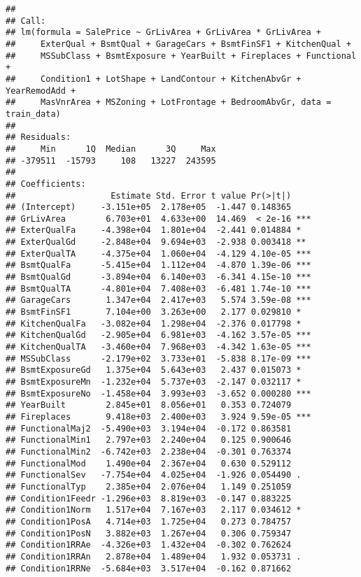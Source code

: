 \documentclass[
]{article}
\begin{document}
\begin{verbatim}
## 
## Call:
## lm(formula = SalePrice ~ GrLivArea + GrLivArea * GrLivArea + 
##     ExterQual + BsmtQual + GarageCars + BsmtFinSF1 + KitchenQual + 
##     MSSubClass + BsmtExposure + YearBuilt + Fireplaces + Functional + 
##     Condition1 + LotShape + LandContour + KitchenAbvGr + YearRemodAdd + 
##     MasVnrArea + MSZoning + LotFrontage + BedroomAbvGr, data = train_data)
## 
## Residuals:
##     Min      1Q  Median      3Q     Max 
## -379511  -15793     108   13227  243595 
## 
## Coefficients:
##                   Estimate Std. Error t value Pr(>|t|)    
## (Intercept)     -3.151e+05  2.178e+05  -1.447 0.148365    
## GrLivArea        6.703e+01  4.633e+00  14.469  < 2e-16 ***
## ExterQualFa     -4.398e+04  1.801e+04  -2.441 0.014884 *  
## ExterQualGd     -2.848e+04  9.694e+03  -2.938 0.003418 ** 
## ExterQualTA     -4.375e+04  1.060e+04  -4.129 4.10e-05 ***
## BsmtQualFa      -5.415e+04  1.112e+04  -4.870 1.39e-06 ***
## BsmtQualGd      -3.894e+04  6.140e+03  -6.341 4.15e-10 ***
## BsmtQualTA      -4.801e+04  7.408e+03  -6.481 1.74e-10 ***
## GarageCars       1.347e+04  2.417e+03   5.574 3.59e-08 ***
## BsmtFinSF1       7.104e+00  3.263e+00   2.177 0.029810 *  
## KitchenQualFa   -3.082e+04  1.298e+04  -2.376 0.017798 *  
## KitchenQualGd   -2.905e+04  6.981e+03  -4.162 3.57e-05 ***
## KitchenQualTA   -3.460e+04  7.968e+03  -4.342 1.63e-05 ***
## MSSubClass      -2.179e+02  3.733e+01  -5.838 8.17e-09 ***
## BsmtExposureGd   1.375e+04  5.643e+03   2.437 0.015073 *  
## BsmtExposureMn  -1.232e+04  5.737e+03  -2.147 0.032117 *  
## BsmtExposureNo  -1.458e+04  3.993e+03  -3.652 0.000280 ***
## YearBuilt        2.845e+01  8.056e+01   0.353 0.724079    
## Fireplaces       9.418e+03  2.400e+03   3.924 9.59e-05 ***
## FunctionalMaj2  -5.490e+03  3.194e+04  -0.172 0.863581    
## FunctionalMin1   2.797e+03  2.240e+04   0.125 0.900646    
## FunctionalMin2  -6.742e+03  2.238e+04  -0.301 0.763374    
## FunctionalMod    1.490e+04  2.367e+04   0.630 0.529112    
## FunctionalSev   -7.754e+04  4.025e+04  -1.926 0.054490 .  
## FunctionalTyp    2.385e+04  2.076e+04   1.149 0.251059    
## Condition1Feedr -1.296e+03  8.819e+03  -0.147 0.883225    
## Condition1Norm   1.517e+04  7.167e+03   2.117 0.034612 *  
## Condition1PosA   4.714e+03  1.725e+04   0.273 0.784757    
## Condition1PosN   3.882e+03  1.267e+04   0.306 0.759347    
## Condition1RRAe  -4.326e+03  1.432e+04  -0.302 0.762624    
## Condition1RRAn   2.878e+04  1.489e+04   1.932 0.053731 .  
## Condition1RRNe  -5.684e+03  3.517e+04  -0.162 0.871662    

\end{verbatim}
\end{document}
